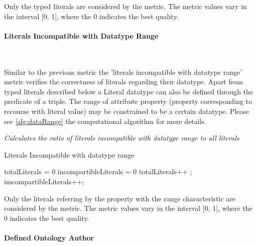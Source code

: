 Only the typed literals are considered by the metric. 
The metric values vary in the interval [0, 1], where the 0 indicates the best quality.



\paragraph{Literals Incompatible with Datatype Range} ~\\ 
\label{par:incompartible}

Similar to the previous metric the 'literals incompatible with datatype range' metric verifies the correctness of literals regarding their datatype. 
Apart from typed literals described below a Literal datatype can also be defined through the predicate of a triple.
The range of attribute property (property corresponding to recourse with literal value) may be constrained to be a certain datatype.
Please see \ref{alg:dataRange} the computational algorithm for more details.

\begin{mdframed}[style=metricdefinition]
\emph{Calculates the ratio of literals incompatible with datatype range to all literals}
\end{mdframed}


\begin{algorithm}
\caption{Literals Incompatible with datatype range}\label{alg:dataRange}
\begin{algorithmic}[1]
\State totalLiterals = 0
\State incompartibleLiterals = 0
\EndProcedure
{}
 totalLiterals++ ;
 imcompartibleLiterals++; 
\EndIf
\EndIf
{}
\EndProcedure
\end{algorithmic}
\end{algorithm}

Only the literals referring by the property with the range characteristic are considered by the metric. 
The metric values vary in the interval [0, 1], where  the 0 indicates the best quality.


\paragraph{Defined Ontology Author} ~\\ 

